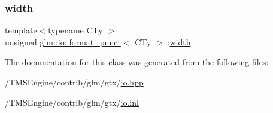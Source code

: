 \subsubsection{\texorpdfstring{width}{width}}
{\footnotesize\ttfamily template$<$typename C\+Ty $>$ \\
unsigned \hyperlink{classglm_1_1io_1_1format__punct}{glm\+::io\+::format\+\_\+punct}$<$ C\+Ty $>$\+::\hyperlink{structglm_1_1io_1_1width}{width}}



The documentation for this class was generated from the following files\+:\begin{DoxyCompactItemize}
\item 
/\+T\+M\+S\+Engine/contrib/glm/gtx/\hyperlink{io_8hpp}{io.\+hpp}\item 
/\+T\+M\+S\+Engine/contrib/glm/gtx/\hyperlink{io_8inl}{io.\+inl}\end{DoxyCompactItemize}

